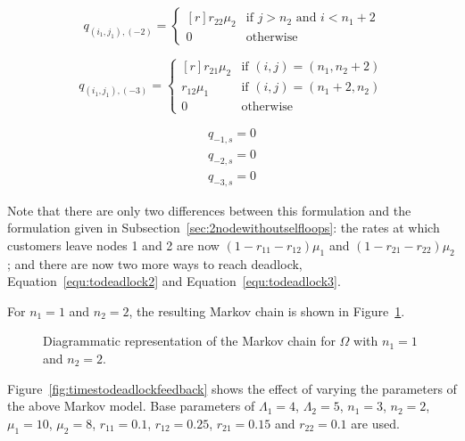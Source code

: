\documentclass{article}
\begin{document}
\begin{equation}\label{equ:todeadlock3}
  q_{(i_1, j_1), (-2)} = \left\{
  \begin{matrix*}[ r ]
    r_{22}\mu_2 & \text{if } j > n_2 \text{ and } i < n_1 + 2 \\
    0 & \text{otherwise}
  \end{matrix*}
  \right.
\end{equation}

\begin{equation}
  q_{(i_1, j_1), (-3)} = \left\{
  \begin{matrix*}[ r ]
    r_{21}\mu_2 & \text{if } (i, j) = (n_1, n_2 + 2) \\
    r_{12}\mu_1 & \text{if } (i, j) = (n_1 + 2, n_2) \\
    0 & \text{otherwise}
  \end{matrix*}
  \right.
\end{equation}

\begin{align}
  q_{-1, s} = 0 \\
  q_{-2, s} = 0 \\
  q_{-3, s} = 0
\end{align}

Note that there are only two differences between this formulation and the formulation given in Subsection~\ref{sec:2nodewithoutselfloops}: the rates at which customers leave nodes 1 and 2 are now $(1-r_{11}-r_{12})\mu_1$ and $(1-r_{21}-r_{22})\mu_2$; and there are now two more ways to reach deadlock, Equation~\ref{equ:todeadlock2} and Equation~\ref{equ:todeadlock3}.

For $n_1 = 1$ and $n_2 = 2$, the resulting Markov chain is shown in Figure~\ref{fig:2nodeMCfeedback}.

\begin{figure}[!htbp]
    \begin{center}
    
    \end{center}
    \caption{Diagrammatic representation of the Markov chain for $\Omega$ with $n_1=1$ and $n_2=2$.}
    \label{fig:2nodeMCfeedback}
\end{figure}

Figure~\ref{fig:timestodeadlockfeedback} shows the effect of varying the parameters of the above Markov model.
Base parameters of $\Lambda_1 = 4$, $\Lambda_2 = 5$, $n_1 = 3$, $n_2 = 2$, $\mu_1 = 10$, $\mu_2 = 8$, $r_{11} = 0.1$, $r_{12} = 0.25$, $r_{21} = 0.15$ and $r_{22} = 0.1$ are used.
\end{document}
